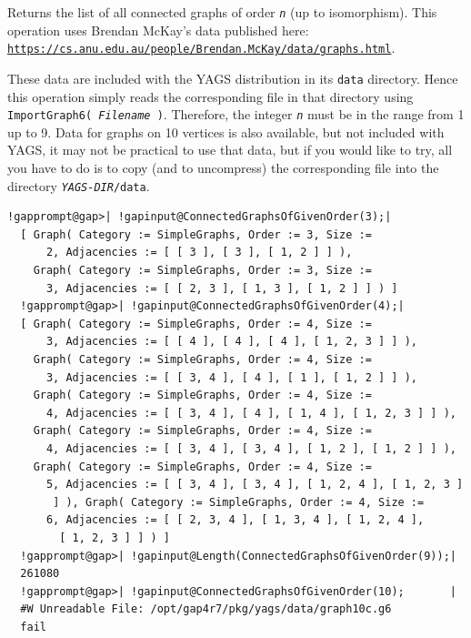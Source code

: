 \documentclass[a4paper,11pt]{report}
\begin{document}
{{{ 

Returns the list of all connected graphs of order \mbox{\texttt{\mdseries\slshape n}} (up to isomorphism). This operation uses Brendan McKay's data published here: \href{https://cs.anu.edu.au/people/Brendan.McKay/data/graphs.html} {\texttt{https://cs.anu.edu.au/people/Brendan.McKay/data/graphs.html}}. 

These data are included with the \textsf{YAGS} distribution in its \texttt{data} directory. Hence this operation simply reads the corresponding file in that
directory using \texttt{ImportGraph6( \mbox{\texttt{\mdseries\slshape Filename}} )}. Therefore, the integer \mbox{\texttt{\mdseries\slshape n}} must be in the range from 1 up to 9. Data for graphs on 10 vertices is also
available, but not included with \textsf{YAGS}, it may not be practical to use that data, but if you would like to try, all
you have to do is to copy (and to uncompress) the corresponding file into the
directory \texttt{\mbox{\texttt{\mdseries\slshape YAGS-DIR}}/data}. 


\begin{Verbatim}[commandchars=!@|,fontsize=\small,frame=single,label=Example]
  !gapprompt@gap>| !gapinput@ConnectedGraphsOfGivenOrder(3);|
  [ Graph( Category := SimpleGraphs, Order := 3, Size := 
      2, Adjacencies := [ [ 3 ], [ 3 ], [ 1, 2 ] ] ), 
    Graph( Category := SimpleGraphs, Order := 3, Size := 
      3, Adjacencies := [ [ 2, 3 ], [ 1, 3 ], [ 1, 2 ] ] ) ]
  !gapprompt@gap>| !gapinput@ConnectedGraphsOfGivenOrder(4);|
  [ Graph( Category := SimpleGraphs, Order := 4, Size := 
      3, Adjacencies := [ [ 4 ], [ 4 ], [ 4 ], [ 1, 2, 3 ] ] ), 
    Graph( Category := SimpleGraphs, Order := 4, Size := 
      3, Adjacencies := [ [ 3, 4 ], [ 4 ], [ 1 ], [ 1, 2 ] ] ), 
    Graph( Category := SimpleGraphs, Order := 4, Size := 
      4, Adjacencies := [ [ 3, 4 ], [ 4 ], [ 1, 4 ], [ 1, 2, 3 ] ] ), 
    Graph( Category := SimpleGraphs, Order := 4, Size := 
      4, Adjacencies := [ [ 3, 4 ], [ 3, 4 ], [ 1, 2 ], [ 1, 2 ] ] ), 
    Graph( Category := SimpleGraphs, Order := 4, Size := 
      5, Adjacencies := [ [ 3, 4 ], [ 3, 4 ], [ 1, 2, 4 ], [ 1, 2, 3 ] 
       ] ), Graph( Category := SimpleGraphs, Order := 4, Size := 
      6, Adjacencies := [ [ 2, 3, 4 ], [ 1, 3, 4 ], [ 1, 2, 4 ], 
        [ 1, 2, 3 ] ] ) ]
  !gapprompt@gap>| !gapinput@Length(ConnectedGraphsOfGivenOrder(9));|
  261080
  !gapprompt@gap>| !gapinput@ConnectedGraphsOfGivenOrder(10);       |
  #W Unreadable File: /opt/gap4r7/pkg/yags/data/graph10c.g6
  fail
\end{Verbatim}
 }

}}
\end{document}
